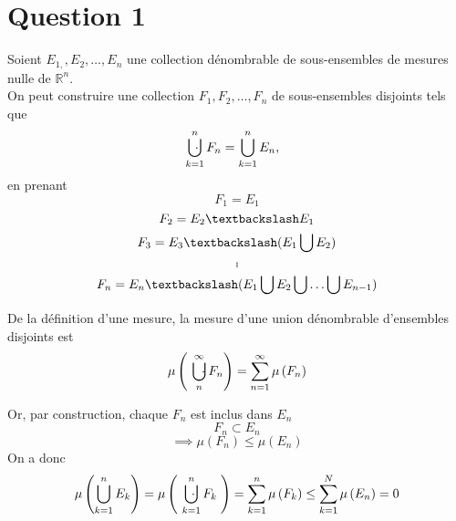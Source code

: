 \documentclass[letterpaper,12pt,oneside,final]{book}
\begin{document}



\newcommand\monPrenom{Frédéric}		%
\newcommand\monNom{Laguë}			%
\newcommand\monMatricule{1986131}	%
\newcommand\monGroupe{01}		%






\section*{Question 1}

Soient \( E_{1,},E_{2},\ldots,E_{n} \) une collection dénombrable de sous-ensembles de mesures nulle de \( \mathbb{R}^{n} \). \\ 
On peut construire une collection \( F_{1},F_{2},\ldots,F_{n} \) de sous-ensembles disjoints tels que 
\[ \cdot \hspace{-11.90pt}\bigcup_{k=1}^{n} F_{n} = \bigcup_{k=1}^{n} E_{n}, \]
en prenant
\[ F_{1} = E_{1} \]
\[ F_{2} = E_{2} \textbackslash E_{1}   \]
\[ F_{3} = E_{3} \textbackslash (E_{1}\bigcup E_{2}) \]
\[ . \]
\[ . \]
\[ . \]
\[ F_{n} = E_{n} \textbackslash (E_{1} \bigcup E_{2}\bigcup \ldots \bigcup E_{n-1} )\]

De la définition d'une mesure, la mesure d'une union dénombrable d'ensembles disjoints est
\[ \mu\left(\hspace{11pt}\cdot\hspace{-11.9pt}\bigcup_{n}^{\infty }F_{n}\right) = \sum_{n=1}^{\infty} \mu \left(F_{n}\right) \]

Or, par construction, chaque \( F_{n}  \) est inclus dans \( E_{n} \) 
\[ F_{n} \subset E_{n} \]
\[ \implies \mu (F_{n}) \leq \mu (E_{n}) \]
On a donc 
\[ \mu\left( \bigcup_{k=1}^{n} E_{k} \right) = \mu\left(\hspace{11pt}\cdot \hspace{-11.9pt}\bigcup_{k=1}^{n} F_{k}\;\right) = \sum_{k=1}^{n} \mu\left( F_{k} \right) \leq \sum_{k=1}^{N} \mu\left( E_{n} \right) = 0 \]
\end{document}
